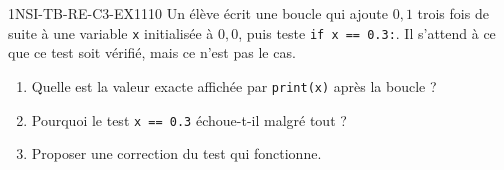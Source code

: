 
\begin{exercice}{1NSI-TB-RE-C3-EX1}{1}{10}
Un élève écrit une boucle qui ajoute $0{,}1$ trois fois de suite à une variable
\lstinline{x} initialisée à $0{,}0$, puis teste \lstinline{if x == 0.3:}. Il s'attend à ce
que ce test soit vérifié, mais ce n'est pas le cas.
\begin{enumerate}
  \item Quelle est la valeur exacte affichée par \lstinline{print(x)} après la boucle ?
  \item Pourquoi le test \lstinline{x == 0.3} échoue-t-il malgré tout ?
  \item Proposer une correction du test qui fonctionne.
\end{enumerate}
\end{exercice}

